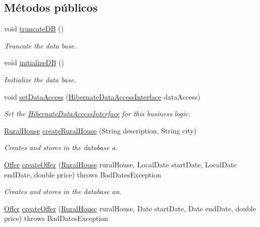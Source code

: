 \subsection*{Métodos públicos}
\begin{DoxyCompactItemize}
\item 
void \mbox{\hyperlink{a00136_aeb85aa3c5dd08bc15e08cc0d4c36882e}{truncate\+DB}} ()
\begin{DoxyCompactList}\small\item\em Truncate the data base. \end{DoxyCompactList}\item 
void \mbox{\hyperlink{a00136_a4670319006cee17060e0c84695d7195f}{initialize\+DB}} ()
\begin{DoxyCompactList}\small\item\em Initialize the data base. \end{DoxyCompactList}\item 
void \mbox{\hyperlink{a00136_a8bb95aa007a4d95b32ed838ae40406c0}{set\+Data\+Access}} (\mbox{\hyperlink{a00148}{Hibernate\+Data\+Access\+Interface}} data\+Access)
\begin{DoxyCompactList}\small\item\em Set the \mbox{\hyperlink{}{Hibernate\+Data\+Access\+Interface}} for this business logic. \end{DoxyCompactList}\item 
\mbox{\hyperlink{a00188}{Rural\+House}} \mbox{\hyperlink{a00136_a7fc244cf74494e50a01148496d1b45ad}{create\+Rural\+House}} (String description, String city)
\begin{DoxyCompactList}\small\item\em Creates and stores in the database a. \end{DoxyCompactList}\item 
\mbox{\hyperlink{a00184}{Offer}} \mbox{\hyperlink{a00136_a5a056a1b07c8ee83c1d540812b0a880d}{create\+Offer}} (\mbox{\hyperlink{a00188}{Rural\+House}} rural\+House, Local\+Date start\+Date, Local\+Date end\+Date, double price)  throws Bad\+Dates\+Exception
\begin{DoxyCompactList}\small\item\em Creates and stores in the database an. \end{DoxyCompactList}\item 
\mbox{\hyperlink{a00184}{Offer}} \mbox{\hyperlink{a00136_afaa6b314fb684fe1121f062481f2bcd9}{create\+Offer}} (\mbox{\hyperlink{a00188}{Rural\+House}} rural\+House, Date start\+Date, Date end\+Date, double price)  throws Bad\+Dates\+Exception

\end{DoxyCompactItemize}
